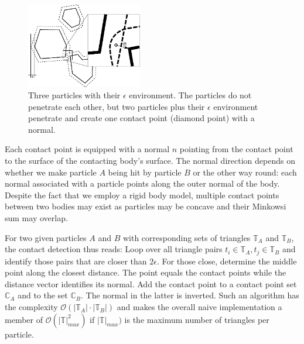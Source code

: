 \begin{figure}[htb]
  \begin{center}
    \includegraphics[width=0.45\textwidth]{sketches/minkowski.pdf}
  \end{center}
  \caption{
    Three particles with their $\epsilon $ environment. The particles do
    not penetrate each other, but two particles plus their $\epsilon $
    environment penetrate and create one contact point (diamond point) with a normal. 
  }
  \label{figure:minkowski}
\end{figure}

Each contact point is equipped with a normal $n$ pointing from the contact point
to the surface of the contacting body's surface.
The normal direction depends on whether we make particle $A$
being hit by particle $B$ or the other way round: each normal associated with a
particle points along the outer normal of the body.
Despite the fact that we employ a rigid body model, multiple contact points
between two bodies may exist as particles may be concave and their Minkowsi sum
may overlap.

For two given particles $A$ and $B$ with corresponding sets of triangles
$\mathbb{T}_A$ and $\mathbb{T}_B$, the contact detection thus reads:
Loop over all triangle pairs $t_i \in \mathbb{T}_A, t_j \in \mathbb{T}_B$ and
identify those pairs that are closer than $2\epsilon $.
For those close, determine the middle point along the closest distance. 
The point equals the contact points while the distance vector identifies
its normal.
Add the contact point to a contact point set $\mathbb{C}_A$ and to the set
$\mathbb{C}_B$.
The normal in the latter is inverted.
Such an algorithm has the complexity $\mathcal{O}( | \mathbb{T}_A| \cdot
|\mathbb{T}_B|)$ and makes the overall naive implementation a member of 
$\mathcal{O}( | \mathbb{T} |_{max}^2  )$ if $| \mathbb{T} |_{max} )$
is the maximum number of triangles per particle.


